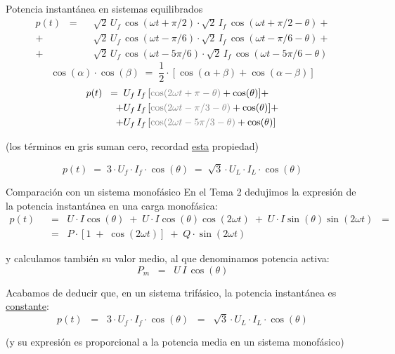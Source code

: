 \documentclass[aspectratio=169, usenames,svgnames,dvipsnames]{beamer}
\begin{document}
\begin{frame}{Potencia instantánea en sistemas equilibrados}
    \begin{align*}
      p(t) \;\; = \;\; &\sqrt{2}\, U_f \, \cos(\omega t + \pi/2) \cdot \sqrt{2}\, I_f\, \cos(\omega t + \pi/2 - \theta) +\\
           + &\sqrt{2}\, U_f \, \cos(\omega t - \pi/6) \cdot \sqrt{2}\, I_f \, \cos(\omega t - \pi/6 - \theta) +\\
           + &\sqrt{2}\, U_f \, \cos(\omega t - 5\pi/6) \cdot \sqrt{2}\, I_f \, \cos(\omega t - 5\pi/6 - \theta)
    \end{align*}
    \[
      \cos(\alpha) \cdot \cos(\beta) \; = \; \frac{1}{2} \cdot [\cos(\alpha + \beta) + \cos(\alpha - \beta)]
    \]
    \begin{align*}
      p(t) \;\; = \;\; &U_f \, I_f \, [{\color{gray}\cos(2 \omega t + \pi -\theta)} + \cos(\theta)] +\\
           + &U_f \, I_f \, [{\color{gray}\cos(2 \omega t - \pi/3 - \theta)} + \cos(\theta)] +\\
           + &U_f \, I_f \, [{\color{gray}\cos(2 \omega t - 5\pi/3 - \theta)} + \cos(\theta)]
    \end{align*}
    \begin{center}
        (los términos en {\color{gray}gris} suman cero, recordad \hyperlink{diapo:sumaFasores_Cero}{esta} propiedad)
    \end{center}
    \[
      \boxed{\quad p(t) \; = \; 3 \cdot U_f \cdot I_f \cdot \cos (\theta) \; = \; \sqrt3 \cdot U_L \cdot I_L \cdot \cos (\theta) \quad}
    \]
\end{frame}


\begin{frame}{Comparación con un sistema monofásico}
    \vspace{2mm}
    En el Tema 2 dedujimos la expresión de la \alert{potencia instantánea} en una \alert{carga monofásica}:    
    \begin{align*}
        p(t) \;\; &= \;\; U \cdot I \cos(\theta) \; + \; U \cdot I \cos(\theta) \cos(2\omega t) \; + \; U \cdot I \sin(\theta) \sin(2\omega t) \;\; = \\
        &= \;\; P \cdot [1 \; + \; \cos(2\omega t)] \; + \; Q \cdot \sin(2\omega t)
    \end{align*}
    
    y calculamos también su valor medio, al que denominamos \alert{potencia activa}:    
    \[
        P_m \;\; = \;\; U\,I\,\cos(\theta)
    \]
    
    Acabamos de deducir que, en un \alert{sistema trifásico}, la \alert{potencia instantánea es \underline{constante}}:    
    \[
      p(t) \;\; = \;\; 3 \cdot U_f \cdot I_f \cdot \cos (\theta) \;\; = \;\; \sqrt3 \cdot U_L \cdot I_L \cdot \cos (\theta)
    \]
    
    (y su expresión es proporcional a la potencia media en un sistema monofásico)    
\end{frame}
\end{document}
